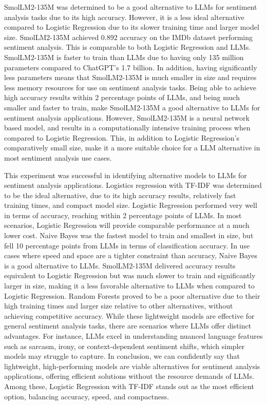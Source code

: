\documentclass[10pt,twocolumn,letterpaper]{article}
\begin{document}
SmolLM2-135M was determined to be a good alternative to LLMs for sentiment analysis tasks due to its high accuracy. However, it is a less ideal alternative compared to Logistic Regression due to its slower training time and larger model size. SmolLM2-135M achieved 0.892 accuracy on the IMDb dataset performing sentiment analysis. This is comparable to both Logistic Regression and LLMs. SmolLM2-135M is faster to train than LLMs due to having only 135 million parameters compared to ChatGPT’s 1.7 billion. In addition, having significantly less parameters means that SmolLM2-135M is much smaller in size and requires less memory resources for use on sentiment analysis tasks. Being able to achieve high accuracy results within 2 percentage points of LLMs, and being much smaller and faster to train, make SmolLM2-135M a good alternative to LLMs for sentiment analysis applications. However, SmolLM2-135M is a neural network based model, and results in a computationally intensive training process when compared to Logistic Regression. This, in addition to Logistic Regression’s comparatively small size, make it a more suitable choice for a LLM alternative in most sentiment analysis use cases. 

This experiment was successful in identifying alternative models to LLMs for sentiment analysis applications. Logistics regression with TF-IDF was determined to be the ideal alternative, due to its high accuracy results, relatively fast training times, and compact model size. Logistic Regression performed very well in terms of accuracy, reaching within 2 percentage points of LLMs. In most scenarios, Logistic Regression will provide comparable performance at a much lower cost. Naive Bayes was the fastest model to train and smallest in size, but fell 10 percentage points from LLMs in terms of classification accuracy. In use cases where speed and space are a tighter constraint than accuracy, Naive Bayes is a good alternative to LLMs. SmolLM2-135M delivered accuracy results equivalent to Logistic Regression but was much slower to train and significantly larger in size, making it a less favorable alternative to LLMs when compared to Logistic Regression. Random Forests proved to be a poor alternative due to their high training times and larger size relative to other alternatives, without achieving competitive accuracy. While these lightweight models are effective for general sentiment analysis tasks, there are scenarios where LLMs offer distinct advantages. For instance, LLMs excel in understanding nuanced language features such as sarcasm, irony, or context-dependent sentiment shifts, which simpler models may struggle to capture. In conclusion, we can confidently say that lightweight, high-performing models are viable alternatives for sentiment analysis applications, offering efficient solutions without the resource demands of LLMs. Among these, Logistic Regression with TF-IDF stands out as the most efficient option, balancing accuracy, speed, and compactness.
\end{document}
